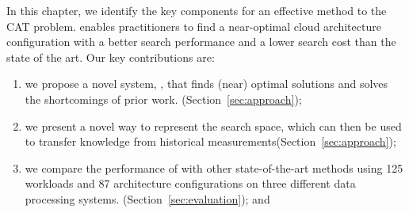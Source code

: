 In this chapter, we identify the key components for an effective method
to the CAT problem.
\scout enables practitioners to find a near-optimal
cloud architecture configuration
with a better search performance and a lower search cost than
the state of the art.
Our key contributions are:

\begin{enumerate}[leftmargin=*]
\setlength\itemsep{-0.4em}
\item we propose a novel system, \scout, that
finds (near) optimal solutions and solves the shortcomings of prior work.
(Section~\ref{sec:approach});
\item we present a novel way to represent the search space,
which can then be used to transfer knowledge
from historical measurements(Section~\ref{sec:approach});
\item we compare the performance of \scout with
other state-of-the-art methods
using 125 workloads and 87 architecture configurations
on three different data processing systems.
(Section~\ref{sec:evaluation}); 
and
\end{enumerate}